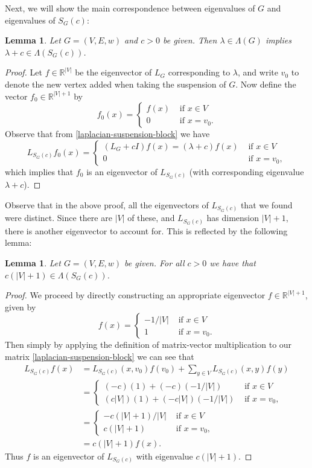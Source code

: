 \documentclass[a4paper,11pt]{article}
\newtheorem{lemma}[theorem]{Lemma}
\theoremstyle{definition}
\newcommand{\R}{\mathbb{R}}
\begin{document}
Next, we will show the main correspondence between eigenvalues of $G$ and eigenvalues of $S_G(c)$:

\begin{lemma}\label{inverse-suspend-old-eigen}
Let $G = (V, E, w)$ and $c > 0$ be given. Then $\lambda \in \Lambda(G)$ implies $\lambda + c \in \Lambda(S_G(c))$.
\end{lemma}
\begin{proof}
Let $f \in \R^{|V|}$ be the eigenvector of $L_G$ corresponding to $\lambda$, and write $v_0$ to denote the new vertex added when taking the suspension of $G$. Now define the vector $f_0 \in \R^{|V| + 1}$ by
\[
f_0(x) = \begin{cases} f(x) & \text{ if } x \in V \\ 0 & \text{ if } x = v_0.\end{cases}
\]
Observe that from \eqref{laplacian-suspension-block} we have
\[
L_{S_G(c)} f_0(x) = \begin{cases} (L_G + cI)f(x) = (\lambda + c)f(x) & \text{ if } x \in V \\ 0 & \text{ if } x = v_0,\end{cases}
\]
which implies that $f_0$ is an eigenvector of $L_{S_G(c)}$ (with corresponding eigenvalue $\lambda + c$).
\end{proof}

Observe that in the above proof, all the eigenvectors of $L_{S_G(c)}$ that we found were distinct. Since there are $|V|$ of these, and $L_{S_G(c)}$ has dimension $|V| + 1$, there is another eigenvector to account for. This is reflected by the following lemma:

\begin{lemma}\label{inverse-suspend-new-eigen}
Let $G = (V, E, w)$ be given. For all $c > 0$ we have that $c(|V| + 1) \in \Lambda(S_G(c))$.
\end{lemma}
\begin{proof}
We proceed by directly constructing an appropriate eigenvector $f \in \R^{|V| + 1}$, given by
\[
f(x) =
\begin{cases}
-1/|V| & \text{ if } x \in V \\
1 & \text{ if } x = v_0.
\end{cases}
\]
Then simply by applying the definition of matrix-vector multiplication to our matrix \eqref{laplacian-suspension-block} we can see that
\begin{align*}
L_{S_G(c)} f(x)
&= L_{S_G(c)}(x, v_0)f(v_0) + \sum_{y \in V} L_{S_G(c)}(x, y)f(y) \\ 
&=
\begin{cases}
(-c)(1) + (-c)(-1/|V|) & \text{ if } x \in V \\
(c|V|)(1) + (-c|V|)(-1/|V|) & \text{ if } x = v_0,
\end{cases} \\
&=
\begin{cases}
-c(|V| + 1)/|V| & \text{ if } x \in V \\
c(|V| + 1) & \text{ if } x = v_0,
\end{cases} \\
&= c(|V| + 1)f(x).
\end{align*}
Thus $f$ is an eigenvector of $L_{S_G(c)}$ with eigenvalue $c(|V| + 1)$.
\end{proof}
\end{document}
